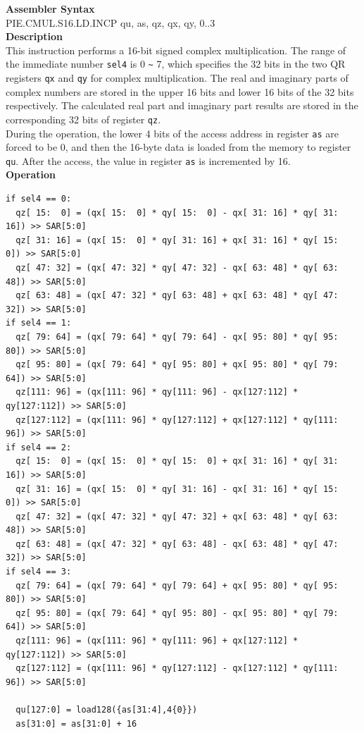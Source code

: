 \textbf{Assembler Syntax} \\
PIE.CMUL.S16.LD.INCP qu, as, qz, qx, qy, 0..3 \\
\textbf{Description} \\
This instruction performs a 16-bit signed complex multiplication. The range of the immediate number \lstinline{sel4} is 0 \verb+~+ 7, which specifies the 32 bits in the two QR registers \lstinline{qx} and \lstinline{qy} for complex multiplication. The real and imaginary parts of complex numbers are stored in the upper 16 bits and lower 16 bits of the 32 bits respectively. The calculated real part and imaginary part results are stored in the corresponding 32 bits of register \lstinline{qz}.\\
During the operation, the lower 4 bits of the access address in register \lstinline{as} are forced to be 0, and then the 16-byte data is loaded from the memory to register \lstinline{qu}. After the access, the value in register \lstinline{as} is incremented by 16.\\
\textbf{Operation}
\begin{lstlisting}
if sel4 == 0:
  qz[ 15:  0] = (qx[ 15:  0] * qy[ 15:  0] - qx[ 31: 16] * qy[ 31: 16]) >> SAR[5:0]
  qz[ 31: 16] = (qx[ 15:  0] * qy[ 31: 16] + qx[ 31: 16] * qy[ 15:  0]) >> SAR[5:0]
  qz[ 47: 32] = (qx[ 47: 32] * qy[ 47: 32] - qx[ 63: 48] * qy[ 63: 48]) >> SAR[5:0]
  qz[ 63: 48] = (qx[ 47: 32] * qy[ 63: 48] + qx[ 63: 48] * qy[ 47: 32]) >> SAR[5:0]
if sel4 == 1:
  qz[ 79: 64] = (qx[ 79: 64] * qy[ 79: 64] - qx[ 95: 80] * qy[ 95: 80]) >> SAR[5:0]
  qz[ 95: 80] = (qx[ 79: 64] * qy[ 95: 80] + qx[ 95: 80] * qy[ 79: 64]) >> SAR[5:0]
  qz[111: 96] = (qx[111: 96] * qy[111: 96] - qx[127:112] * qy[127:112]) >> SAR[5:0]
  qz[127:112] = (qx[111: 96] * qy[127:112] + qx[127:112] * qy[111: 96]) >> SAR[5:0]
if sel4 == 2:
  qz[ 15:  0] = (qx[ 15:  0] * qy[ 15:  0] + qx[ 31: 16] * qy[ 31: 16]) >> SAR[5:0]
  qz[ 31: 16] = (qx[ 15:  0] * qy[ 31: 16] - qx[ 31: 16] * qy[ 15:  0]) >> SAR[5:0]
  qz[ 47: 32] = (qx[ 47: 32] * qy[ 47: 32] + qx[ 63: 48] * qy[ 63: 48]) >> SAR[5:0]
  qz[ 63: 48] = (qx[ 47: 32] * qy[ 63: 48] - qx[ 63: 48] * qy[ 47: 32]) >> SAR[5:0]
if sel4 == 3:
  qz[ 79: 64] = (qx[ 79: 64] * qy[ 79: 64] + qx[ 95: 80] * qy[ 95: 80]) >> SAR[5:0]
  qz[ 95: 80] = (qx[ 79: 64] * qy[ 95: 80] - qx[ 95: 80] * qy[ 79: 64]) >> SAR[5:0]
  qz[111: 96] = (qx[111: 96] * qy[111: 96] + qx[127:112] * qy[127:112]) >> SAR[5:0]
  qz[127:112] = (qx[111: 96] * qy[127:112] - qx[127:112] * qy[111: 96]) >> SAR[5:0]

  qu[127:0] = load128({as[31:4],4{0}})
  as[31:0] = as[31:0] + 16
\end{lstlisting}

